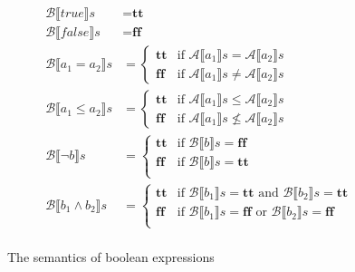 \documentclass{article}
\begin{document}
\begin{figure}[H]
    \begin{tcolorbox}[colframe=black, colback=white, sharp corners]

        \begin{equation}
        \begin{split}
        \mathcal{B}\llbracket true \rrbracket s &= \textbf{tt} \\
        \mathcal{B}\llbracket false \rrbracket s &= \textbf{ff} \\
        \mathcal{B}\llbracket a_1 = a_2 \rrbracket s &= \begin{cases}
              \textbf{tt} & \text{if } \mathcal{A}\llbracket a_1 \rrbracket s = \mathcal{A}\llbracket a_2 \rrbracket s \\
              \textbf{ff} & \text{if } \mathcal{A}\llbracket a_1 \rrbracket s \neq \mathcal{A}\llbracket a_2 \rrbracket s
            \end{cases}  \\
        \mathcal{B}\llbracket a_1 \leq a_2 \rrbracket s &= \begin{cases}
              \textbf{tt} & \text{if } \mathcal{A}\llbracket a_1 \rrbracket s \leq \mathcal{A}\llbracket a_2 \rrbracket s \\
              \textbf{ff} & \text{if } \mathcal{A}\llbracket a_1 \rrbracket s \nleq \mathcal{A}\llbracket a_2 \rrbracket s
            \end{cases}  \\
        \mathcal{B}\llbracket \neg{b} \rrbracket s &= \begin{cases}
              \textbf{tt} & \text{if } \mathcal{B}\llbracket b \rrbracket s = \textbf{ff} \\
              \textbf{ff} & \text{if } \mathcal{B}\llbracket b \rrbracket s = \textbf{tt} \\
            \end{cases}  \\
        \mathcal{B}\llbracket b_1 \wedge b_2 \rrbracket s &= \begin{cases}
              \textbf{tt} & \text{if } \mathcal{B}\llbracket b_1 \rrbracket s = \textbf{tt} \text{ and } \mathcal{B}\llbracket b_2 \rrbracket s = \textbf{tt} \\
              \textbf{ff} & \text{if } \mathcal{B}\llbracket b_1 \rrbracket s = \textbf{ff} \text{ or } \mathcal{B}\llbracket b_2 \rrbracket s = \textbf{ff} \\
            \end{cases} \\
        \end{split}
        \end{equation}
    \end{tcolorbox}
    \caption{The semantics of boolean expressions}
    \label{fig:bexp}
\end{figure}
\end{document}
